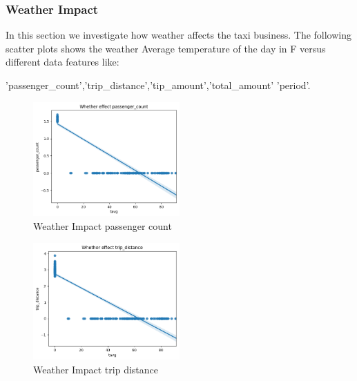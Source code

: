 \documentclass[11pt]{article}
\begin{document}
\subsubsection{Weather Impact}
In this section we investigate how weather affects the taxi business. The following scatter plots shows the weather Average temperature of the day in F versus diﬀerent data features like:


'passenger\_count','trip\_distance','tip\_amount','total\_amount' 'period'. 

\begin{figure}[!h]
    \centering
    \includegraphics[width=0.5\textwidth]{plots/p4.png}
    \caption{Weather Impact passenger count} %
    \label{fig:image3}
\end{figure}

\begin{figure}[!h]
    \centering
    \includegraphics[width=0.5\textwidth]{plots/p5.png}
    \caption{Weather Impact trip distance} %
    \label{fig:image3}
\end{figure}
\end{document}
